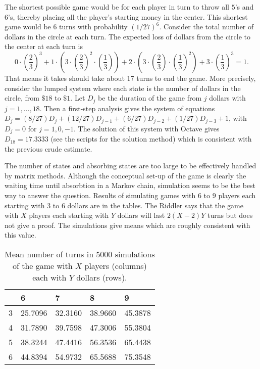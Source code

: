 \documentclass[12pt]{article}
\begin{document}
\begin{example}
    The shortest possible game would be for each player in turn to throw
    all \( 5 \)'s and \( 6 \)'s, thereby placing all the player's
    starting money in the center.  This shortest game would be \( 6 \)
    turns with probability \( (1/27)^6 \).  Consider the total number of
    dollars in the circle at each turn.  The expected loss of dollars
    from the circle to the center at each turn is
    \[
        0 \cdot \left( \frac{2}{3} \right)^3 + 1 \cdot \left( 3 \cdot
        \left( \frac{2}{3} \right)^2 \cdot \left( \frac{1}{3} \right)
        \right) + 2 \cdot \left( 3 \cdot \left( \frac{2}{3} \right)
        \cdot \left( \frac{1}{3} \right)^2 \right) + 3 \cdot \left( \frac
        {1}{3} \right)^3 = 1.
    \] That means it takes should take about \( 17 \) turns to end the
    game.  More precisely, consider the lumped system where each state
    is the number of dollars in the circle, from \( \$18 \) to \( \$1 \).
    Let \( D_j \) be the duration of the game from \( j \) dollars with \(
    j = 1, \dots, 18 \).  Then a first-step analysis gives the system of
    equations \( D_j = (8/27)D_j + (12/27)D_{j-1} + (6/27)D_{j-2} + (1/27)D_
    {j-3} + 1 \), with \( D_j = 0 \) for \( j = 1, 0, -1 \).  The
    solution of this system with Octave gives \( D_{18} = 17.3333 \)
    (see the scripts for the solution method)
    which is consistent with the previous crude estimate.

    The number of states and absorbing states are too large to be
    effectively handled by matrix methods.  Although the conceptual
    set-up of the game is clearly the waiting time until absorbtion in a
    Markov chain, simulation seems to be the best way to answer the
    question.  Results of simulating games with \( 6 \) to \( 9 \)
    players each starting with \( 3 \) to \( 6 \) dollars are in the
    tables.  The Riddler says that the game with \( X \) players each
    starting with \( Y \) dollars will last \( 2(X-2)Y \) turns but does
    not give a proof. The simulations give means which are roughly consistent
    with this value.
    \begin{table}
        \centering
        \begin{tabular}{l | llll}
                   & 6       & 7       & 8       & 9       \\ 
            \hline
            3      & 25.7096 & 32.3160 & 38.9660 & 45.3878 \\ 
            4      & 31.7890 & 39.7598 & 47.3006 & 55.3804 \\ 
            5      & 38.3244 & 47.4416 & 56.3536 & 65.4438 \\ 
            6      & 44.8394 & 54.9732 & 65.5688 & 75.3548
        \end{tabular}
        \caption{Mean number of turns in $ 5000 $ simulations of the
        game with $ X $ players (columns) each with $ Y $ dollars (rows).}
        \label{tab:waitingtimeabsorbtion:lcrmean}
    \end{table}


\end{example}
\end{document}
